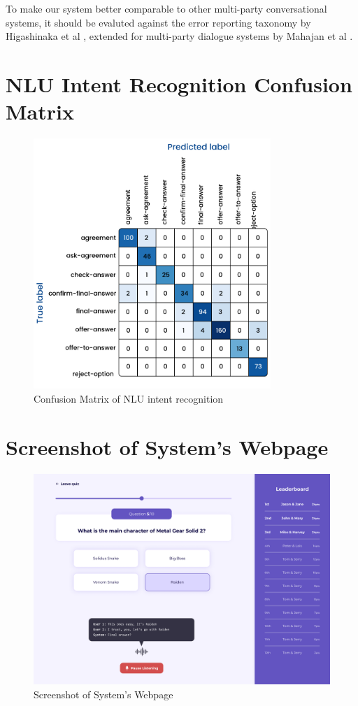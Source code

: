 \documentclass[hidelinks, 11pt]{article}
\begin{document}
To make our system better comparable to other multi-party conversational systems, it should be evaluted against the error reporting taxonomy by Higashinaka et al \cite{Higashinaka_Araki_Tsukahara_Mizukami_2021}, extended for multi-party dialogue systems by Mahajan et al \cite{Mahajan_Santhanam_Shaikh_2022}.




\clearpage
\onecolumn
\appendix

\section{NLU Intent Recognition Confusion Matrix}
\label{app:cm_intent_recognition}

\begin{figure}[h!]
  \centering
  \includegraphics[width=0.8\textwidth]{images/intent_confusion_matrix.jpg}
  \caption{Confusion Matrix of NLU intent recognition}
\end{figure}

\newpage

\section{Screenshot of System's Webpage}
\label{app:system_webpage}

\begin{figure}[h!]
  \centering
  \includegraphics[width=\textwidth]{images/webpage.png}
  \caption{Screenshot of System's Webpage}
\end{figure}
\end{document}
